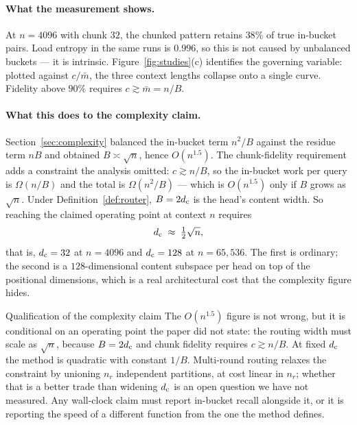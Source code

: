 \begin{table}[h]
\centering
\small

\caption{Fidelity of bucket-sorted fixed-size chunking ($d=128$, 4 heads, $B=32$, window 1). $\bar{m} = n/B$ is the mean bucket size. Load entropy is near-perfect throughout, so the loss of fidelity is not an imbalance artefact.}
\label{tab:s7}
\end{table}

\paragraph{What the measurement shows.} At $n=4096$ with chunk $32$, the chunked pattern retains $38\%$ of true in-bucket pairs. Load entropy in the same runs is $0.996$, so this is not caused by unbalanced buckets --- it is intrinsic. Figure~\ref{fig:studies}(c) identifies the governing variable: plotted against $c/\bar{m}$, the three context lengths collapse onto a single curve. Fidelity above $90\%$ requires $c \gtrsim \bar{m} = n/B$.

\paragraph{What this does to the complexity claim.} Section~\ref{sec:complexity} balanced the in-bucket term $n^2/B$ against the residue term $nB$ and obtained $B \asymp \sqrt{n}$, hence $O(n^{1.5})$. The chunk-fidelity requirement adds a constraint the analysis omitted: $c \gtrsim n/B$, so the in-bucket work per query is $\Omega(n/B)$ and the total is $\Omega(n^2/B)$ --- which is $O(n^{1.5})$ only if $B$ grows as $\sqrt{n}$. Under Definition~\ref{def:router}, $B = 2d_{\mathrm{c}}$ is the head's content width. So reaching the claimed operating point at context $n$ requires
\begin{equation}
  d_{\mathrm{c}} \;\approx\; \tfrac{1}{2}\sqrt{n},
\end{equation}
that is, $d_{\mathrm{c}} = 32$ at $n = 4096$ and $d_{\mathrm{c}} = 128$ at $n = 65{,}536$. The first is ordinary; the second is a $128$-dimensional content subspace per head on top of the positional dimensions, which is a real architectural cost that the complexity figure hides.

\begin{revision}{Qualification of the complexity claim}
The $O(n^{1.5})$ figure is not wrong, but it is conditional on an operating point the paper did not state: the routing width must scale as $\sqrt{n}$, because $B = 2d_{\mathrm{c}}$ and chunk fidelity requires $c \gtrsim n/B$. At fixed $d_{\mathrm{c}}$ the method is quadratic with constant $1/B$. Multi-round routing relaxes the constraint by unioning $n_r$ independent partitions, at cost linear in $n_r$; whether that is a better trade than widening $d_{\mathrm{c}}$ is an open question we have not measured. Any wall-clock claim must report in-bucket recall alongside it, or it is reporting the speed of a different function from the one the method defines.
\end{revision}

